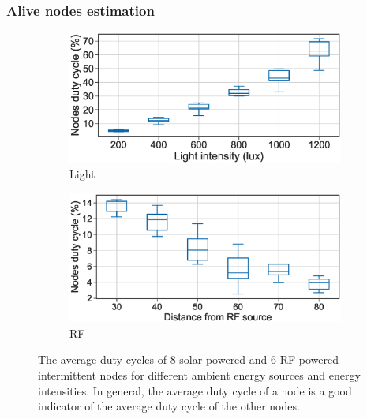 \subsubsection{Alive nodes estimation}
\begin{figure}[t]
		\centering
		\begin{subfigure}{.49\columnwidth}
			\centering
			\includegraphics[width=\textwidth]{figures/cis_dutyCycle}
			\caption{Light}
		\end{subfigure}\hfill
		\begin{subfigure}{.49\columnwidth}
			\centering
			\includegraphics[width=\textwidth]{figures/rf_cis_dutyCycle}
			\caption{RF}
		\end{subfigure}\hfill
		\caption{The average duty cycles of 8 solar-powered and 6 RF-powered intermittent nodes for different ambient energy sources and energy intensities. In general, the average duty cycle of a node is a good indicator of the average duty cycle of the other \cis nodes.}
		\label{fig:cis_nodes_dutyCycle}
\end{figure} 


